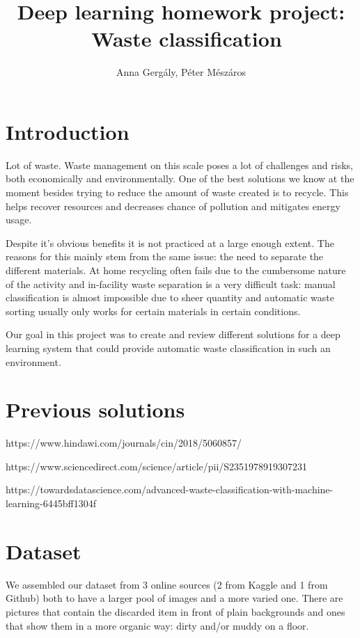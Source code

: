 \documentclass{article}
\begin{document}
	\title{Deep learning homework project: \ Waste classification}
	\author{Anna Gergály, Péter Mészáros}
	\maketitle
	
	\section{Introduction}
	Lot of waste. Waste management on this scale poses a lot of challenges and risks, both economically and environmentally. One of the best solutions we know at the moment besides trying to reduce the amount of waste created is to recycle. This helps recover resources and decreases chance of pollution and mitigates energy usage. 
	
	Despite it's obvious benefits it is not practiced at a large enough extent. The reasons for this mainly stem from the same issue: the need to separate the different materials. At home recycling often fails due to the cumbersome nature of the activity and in-facility waste separation is a very difficult task: manual classification is almost impossible due to sheer quantity and automatic waste sorting usually only works for certain materials in certain conditions.
	
	Our goal in this project was to create and review different solutions for a deep learning system that could provide automatic waste classification in such an environment.
	\section{Previous solutions}
	https://www.hindawi.com/journals/cin/2018/5060857/
	
	https://www.sciencedirect.com/science/article/pii/S2351978919307231
	
	https://towardsdatascience.com/advanced-waste-classification-with-machine-learning-6445bff1304f
	
	\section{Dataset}
	We assembled our dataset from 3 online sources (2 from Kaggle and 1 from Github) both to have a larger pool of images and a more varied one. There are pictures that contain the discarded item in front of plain backgrounds and ones that show them in a more organic way: dirty and/or muddy on a floor. 
	
\end{document}
